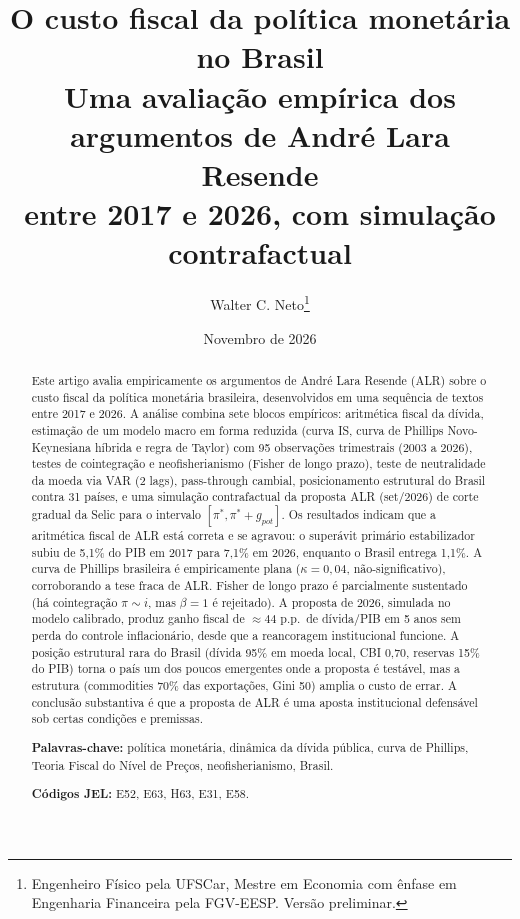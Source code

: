 \documentclass[11pt,a4paper]{article}
\title{\textbf{O custo fiscal da política monetária no Brasil}\\
  \large Uma avaliação empírica dos argumentos de André Lara Resende\\
  entre 2017 e 2026, com simulação contrafactual}
\author{Walter C. Neto\thanks{Engenheiro Físico pela UFSCar, Mestre em Economia
com ênfase em Engenharia Financeira pela FGV-EESP. Versão preliminar.}}
\date{Novembro de 2026}
\begin{document}
\maketitle

\begin{abstract}
\noindent
Este artigo avalia empiricamente os argumentos de André Lara Resende (ALR)
sobre o custo fiscal da política monetária brasileira, desenvolvidos em uma
sequência de textos entre 2017 e 2026. A análise combina sete blocos
empíricos: aritmética fiscal da dívida, estimação de um modelo macro em forma
reduzida (curva IS, curva de Phillips Novo-Keynesiana híbrida e regra de
Taylor) com 95 observações trimestrais (2003 a 2026), testes de cointegração
e neofisherianismo (Fisher de longo prazo), teste de neutralidade da moeda
via VAR (2 lags), pass-through cambial, posicionamento estrutural do Brasil
contra 31 países, e uma simulação contrafactual da proposta ALR (set/2026) de
corte gradual da Selic para o intervalo $[\pi^*, \pi^* + g_{pot}]$.
Os resultados indicam que a aritmética fiscal de ALR está correta e se
agravou: o superávit primário estabilizador subiu de 5{,}1\% do PIB em 2017 para
7{,}1\% em 2026, enquanto o Brasil entrega 1{,}1\%. A curva de Phillips brasileira
é empiricamente plana ($\kappa = 0{,}04$, não-significativo), corroborando
a tese fraca de ALR. Fisher de longo prazo é parcialmente sustentado (há
cointegração $\pi \sim i$, mas $\beta = 1$ é rejeitado). A proposta de 2026,
simulada no modelo calibrado, produz ganho fiscal de $\approx 44$ p.p.\ de
dívida/PIB em 5 anos sem perda do controle inflacionário, desde que
a reancoragem institucional funcione. A posição estrutural rara do Brasil
(dívida 95\% em moeda local, CBI 0{,}70, reservas 15\% do PIB) torna o país
um dos poucos emergentes onde a proposta é testável, mas a estrutura
(commodities 70\% das exportações, Gini 50) amplia o custo de errar. A
conclusão substantiva é que a proposta de ALR é uma aposta
institucional defensável sob certas condições e premissas.

\vspace{0.5em}
\noindent\textbf{Palavras-chave:} política monetária, dinâmica da dívida pública,
curva de Phillips, Teoria Fiscal do Nível de Preços, neofisherianismo, Brasil.

\noindent\textbf{Códigos JEL:} E52, E63, H63, E31, E58.
\end{abstract}

\vspace{1em}
\end{document}

